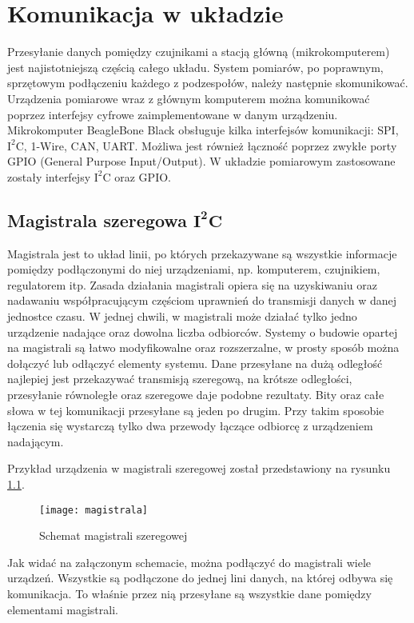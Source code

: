 \chapter{Komunikacja w układzie}

Przesyłanie danych pomiędzy czujnikami a stacją główną (mikrokomputerem) jest najistotniejszą częścią całego układu. System pomiarów, po poprawnym, sprzętowym podłączeniu każdego z podzespołów, należy następnie skomunikować. Urządzenia pomiarowe wraz z głównym komputerem można komunikować poprzez interfejsy cyfrowe zaimplementowane w danym urządzeniu. Mikrokomputer BeagleBone Black obsługuje kilka interfejsów komunikacji: SPI, $\mathrm{I^{2}C}$, 1-Wire, CAN, UART. Możliwa jest również łączność poprzez zwykłe porty GPIO (General Purpose Input/Output). W układzie pomiarowym zastosowane zostały interfejsy $\mathrm{I^{2}C}$ oraz GPIO.

\section{Magistrala szeregowa $\mathbf{I^{2}C}$}
Magistrala jest to układ linii, po których przekazywane są wszystkie informacje pomiędzy podłączonymi do niej urządzeniami, np. komputerem, czujnikiem, regulatorem itp. Zasada działania magistrali opiera się na uzyskiwaniu oraz nadawaniu współpracującym częściom uprawnień do transmisji danych w danej jednostce czasu. W jednej chwili, w magistrali może działać tylko jedno urządzenie nadające oraz dowolna liczba odbiorców. Systemy o budowie opartej na magistrali są łatwo modyfikowalne oraz rozszerzalne, w prosty sposób można dołączyć lub odłączyć elementy systemu.
Dane przesyłane na dużą odległość najlepiej jest przekazywać transmisją szeregową, na krótsze odległości, przesyłanie równoległe oraz szeregowe daje podobne rezultaty.
Bity oraz całe słowa w tej komunikacji przesyłane są jeden po drugim. Przy takim sposobie łączenia się wystarczą tylko dwa przewody łączące odbiorcę z urządzeniem nadającym. 

Przykład urządzenia w magistrali szeregowej został przedstawiony na  rysunku \ref{fig:magistrala}.
\begin{figure}[h]
\centering
\texttt{[image: magistrala]}
\caption{Schemat magistrali szeregowej}
\label{fig:magistrala}
\end{figure}

Jak widać na załączonym schemacie, można podłączyć do magistrali wiele urządzeń. Wszystkie są podłączone do jednej lini danych, na której odbywa się komunikacja. To właśnie przez nią przesyłane są wszystkie dane pomiędzy elementami magistrali.


